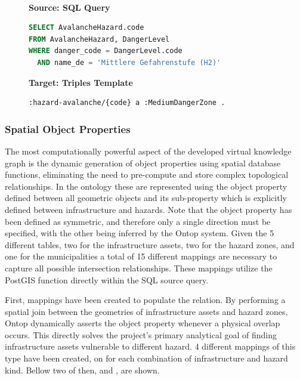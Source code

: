 \begin{figure}[ht!]
  \vspace*{-1mm}
  \textbf{\small{}} \\
  \begin{minipage}[t]{0.50\textwidth}
    \centering
    \textbf{\scriptsize Source: SQL Query}
\begin{lstlisting}[language=SQL]
SELECT AvalancheHazard.code
FROM AvalancheHazard, DangerLevel
WHERE danger_code = DangerLevel.code
  AND name_de = 'Mittlere Gefahrenstufe (H2)'
\end{lstlisting}
  \end{minipage}
  \hfill
  \begin{minipage}[t]{0.50\textwidth}
    \centering
    \textbf{\scriptsize Target: Triples Template}
\begin{lstlisting}[language=Turtle]
:hazard-avalanche/{code} a :MediumDangerZone . 
\end{lstlisting}
  \end{minipage}
  \vspace*{-4mm}
\end{figure}


\subsubsection{Spatial Object Properties}

The most computationally powerful aspect of the developed virtual knowledge graph is the dynamic generation of object properties using spatial database functions, eliminating the need to pre-compute and store complex topological relationships. In the ontology these are represented using the  object property defined between all geometric objects and its sub-property  which is explicitly defined between infrastructure and hazards. Note that the  object property has been defined as symmetric, and therefore only a single direction must be specified, with the other being inferred by the Ontop system. Given the 5 different tables, two for the infrastructure assets, two for the hazard zones, and one for the municipalities a total of 15 different mappings are necessary to capture all possible intersection relationships. These mappings utilize the PostGIS  function directly within the SQL source query.

First, mappings have been created to populate the  relation. By performing a spatial join between the geometries of infrastructure assets and hazard zones, Ontop dynamically asserts the  object property whenever a physical overlap occurs. This directly solves the project's primary analytical goal of finding infrastructure assets vulnerable to different hazard. 4 different mappings of this type have been created, on for each combination of infrastructure and hazard kind. Bellow two of then,  and , are shown.

